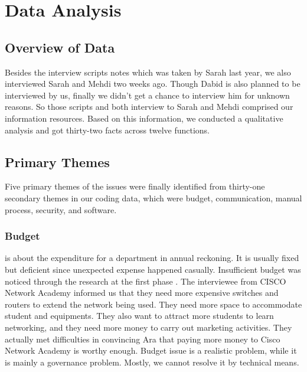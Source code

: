 
\section{Data Analysis}

\subsection{Overview of Data}
Besides the interview scripts notes which was taken by Sarah last year, we also interviewed Sarah and Mehdi two weeks ago. Though Dabid is also planned to be interviewed by us, finally we didn't get a chance to interview him for unknown reasons. So those scripts and both interview to Sarah and Mehdi comprised our information resources. Based on this information, we conducted a qualitative analysis and got thirty-two facts across twelve functions.

\subsection{Primary Themes}
Five primary themes of the issues were finally identified from thirty-one secondary themes in our coding data, which were budget, communication, manual process, security, and software. 

\subsubsection{Budget} is about the expenditure for a department in annual reckoning. It is usually fixed but deficient since unexpected expense happened casually. Insufficient budget was noticed through the research at the first phase . The interviewee from CISCO Network Academy informed us that they need more expensive switches and routers to extend the network being used. They need more space to accommodate student and equipments. They also want to attract more students to learn networking, and they need more money to carry out marketing activities. They actually met difficulties in convincing Ara that paying more money to Cisco Network Academy is worthy enough. Budget issue is a realistic problem, while it is mainly a governance problem. Mostly, we cannot resolve it by technical means.

